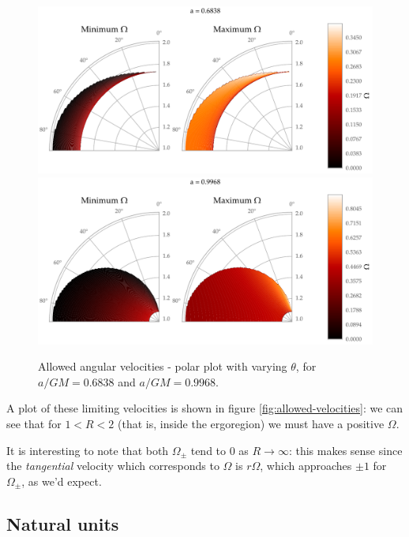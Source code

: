 \documentclass[main.tex]{subfiles}
\begin{document}
\begin{figure}[h!]
  \centering
  \includegraphics[width=\textwidth]{figures/refined_limiting_angle_a_0_6838.pdf}
  \includegraphics[width=\textwidth]{figures/refined_limiting_angle_a_0_9968.pdf}
  \caption{Allowed angular velocities - polar plot with varying \(\theta \), for \(a/GM = 0.6838\) and \(a/GM = 0.9968\).}
  \label{fig:allowed-velocities-polar}
\end{figure}

A plot of these limiting velocities is shown in figure \ref{fig:allowed-velocities}: we can see that for \(1<R<2\) (that is, inside the ergoregion) we must have a positive \(\Omega \).

It is interesting to note that both \(\Omega_{\pm}\) tend to 0 as \(R \rightarrow \infty \): this makes sense since the \emph{tangential} velocity which corresponds to \(\Omega \) is \(r \Omega \), which approaches \(\pm 1\) for \(\Omega_{\pm}\), as we'd expect. 

\subsection{Natural units}
\end{document}
